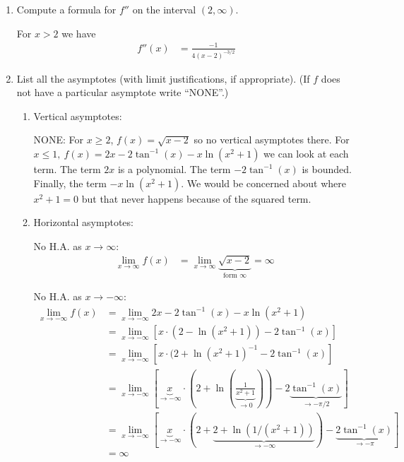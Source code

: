 \documentclass[nooutcomes]{ximera}
\begin{document}
\begin{problem}
\begin{enumerate}
    \item Compute a formula for $f''$ on the interval $(2, \infty)$.
 \begin{freeResponse}
        For $x>2$ we have
        \begin{align*}
          f''(x) &= \frac{-1}{4(x-2)^{-3/2}}
        \end{align*}
      \end{freeResponse}


    \item List all the asymptotes (with limit justifications, if appropriate).
      (If $f$ does not have a particular asymptote write ``NONE''.)
      \begin{enumerate}
        \item
          Vertical asymptotes:
              \begin{freeResponse}
            NONE: For $x \ge 2$, $f(x)=\sqrt{x - 2}$ so no vertical asymptotes there.  For $x \le 1,\ f(x)= 2x - 2\tan^{-1}(x) - x \ln(x^2+1)$ we can look at each term.  The term $2x$ is a polynomial.  The term $- 2\tan^{-1}(x)$ is bounded.  Finally, the term $- x \ln(x^2+1)$.  We would be concerned about where $x^2+1=0$ but that never happens because of the squared term.
          \end{freeResponse}

        \item
          Horizontal asymptotes:
           \begin{freeResponse}
            No H.A. as $x \to \infty$:
            \begin{align*}
              \lim_{x\to\infty} f(x) &= \lim_{x \to \infty} \underbrace{\sqrt{x-2}}_{\text{form $\infty$}} = \infty
            \end{align*}

            No H.A. as $x \to -\infty$:
            \begin{align*}
              \lim_{x \to -\infty} f(x) &= \lim_{x \to -\infty} 2x - 2\tan^{-1}(x) - x \ln(x^2+1)\\
              &= \lim_{x \to -\infty} \left[x\cdot(2 - \ln(x^2+1)) - 2\tan^{-1}(x)\right]\\
              &= \lim_{x \to -\infty} \left[x \cdot(2 + \ln(x^2+1)^{-1} -2\tan^{-1}(x) \right]\\
              &= \lim_{x \to -\infty} \left[\underbrace{x}_{\text{$\to -\infty$}} \cdot \left(2 + \ln\left(\underbrace{\frac{1}{x^2+1}}_{\text{$\to 0$}}\right)\right) -2\underbrace{\tan^{-1}(x)}_{\text{$\to -\pi/2$}} \right]\\
              &= \lim_{x \to -\infty} \left[\underbrace{x}_{\text{$\to -\infty$}} \cdot \left( 2 + \underbrace{2 + \ln(1/(x^2+1))}_{\to -\infty}\right) -\underbrace{2\tan^{-1}(x)}_{\text{$\to -\pi$}} \right]\\
              &= \infty
            \end{align*}
          \end{freeResponse}
      \end{enumerate}


\end{enumerate}
\end{problem}
\end{document}
